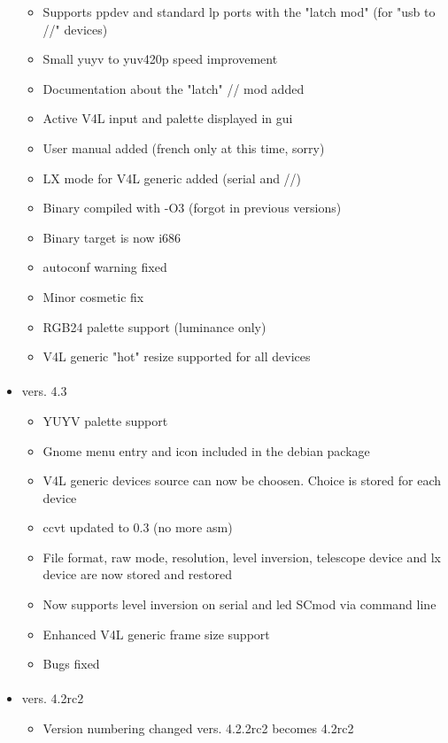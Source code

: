 \documentclass[11pt,a4paper]{book}
\begin{document}
\begin{itemize}
\begin{itemize}
\item Supports ppdev and standard lp ports with the "latch mod" (for "usb to //" devices)
\item Small yuyv to yuv420p speed improvement
\item Documentation about the "latch" // mod added
\item Active V4L input and palette displayed in gui
\item User manual added (french only at this time, sorry)
\item LX mode for V4L generic added (serial and //)
\item Binary compiled with -O3 (forgot in previous versions)
\item Binary target is now i686
\item autoconf warning fixed
\item Minor cosmetic fix
\item RGB24 palette support (luminance only)
\item V4L generic "hot" resize supported for all devices
\end{itemize}
\paragraph*{}
\item vers. 4.3
\begin{itemize}
\item YUYV palette support
\item Gnome menu entry and icon included in the debian package
\item V4L generic devices source can now be choosen. Choice is stored for each device
\item ccvt updated to 0.3 (no more asm)
\item File format, raw mode, resolution, level inversion, telescope device and lx device 
 are now stored and restored
\item Now supports level inversion on serial and led SCmod via command line
\item Enhanced V4L generic frame size support
\item Bugs fixed
\end{itemize}
\paragraph*{}
\item vers. 4.2rc2
\begin{itemize}
\item Version numbering changed vers. 4.2.2rc2 becomes 4.2rc2
\end{itemize}

\end{itemize}
\end{document}
